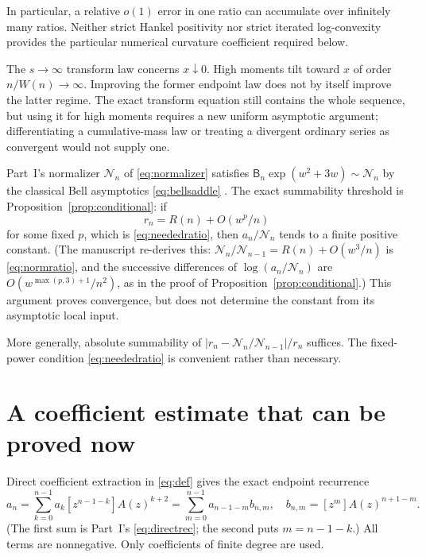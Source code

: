 \documentclass[11pt]{article}
\numberwithin{equation}{section}
\theoremstyle{definition}
\theoremstyle{remark}
\begin{document}
In particular, a relative $o(1)$ error in one ratio can accumulate over
infinitely many ratios. Neither strict Hankel positivity nor strict
iterated log-convexity provides the particular numerical curvature
coefficient required below.

The $s\to\infty$ transform law concerns $x\downarrow0$. High moments tilt
toward $x$ of order $n/W(n)\to\infty$. Improving the former endpoint law
does not by itself improve the latter regime. The exact transform equation
still contains the whole sequence, but using it for high moments requires
a new uniform asymptotic argument; differentiating a cumulative-mass law
or treating a divergent ordinary series as convergent would not supply
one.

Part~I's normalizer $\mathcal N_n$ of \eqref{eq:normalizer} satisfies
$\mathsf B_n\exp(w^2+3w)\sim\mathcal N_n$ by the classical Bell asymptotics
\eqref{eq:bellsaddle} \cite{moserwyman}. The exact summability threshold
is Proposition~\ref{prop:conditional}: if
\[
 r_n=R(n)+O(w^p/n)
\]
for some fixed $p$, which is \eqref{eq:neededratio}, then
$a_n/\mathcal N_n$ tends to a finite positive constant. (The manuscript
re-derives this: $\mathcal N_n/\mathcal N_{n-1}=R(n)+O(w^3/n)$ is
\eqref{eq:normratio}, and the successive differences of
$\log(a_n/\mathcal N_n)$ are $O(w^{\max(p,3)+1}/n^2)$, as in the proof of
Proposition~\ref{prop:conditional}.) This argument proves convergence, but
does not determine the constant from its asymptotic local input.

More generally, absolute summability of
$|r_n-\mathcal N_n/\mathcal N_{n-1}|/r_n$ suffices. The fixed-power
condition \eqref{eq:neededratio} is convenient rather than necessary.

\section{A coefficient estimate that can be proved now}\label{ble:sec:coef}
Direct coefficient extraction in \eqref{eq:def} gives the exact endpoint
recurrence
\begin{equation}\label{ble:eq:rec}
 a_n=\sum_{k=0}^{n-1}a_k[z^{n-1-k}]A(z)^{k+2}
 =\sum_{m=0}^{n-1}a_{n-1-m}b_{n,m},
 \quad b_{n,m}=[z^m]A(z)^{n+1-m}.
\end{equation}
(The first sum is Part~I's \eqref{eq:directrec}; the second puts
$m=n-1-k$.) All terms are nonnegative. Only coefficients of finite degree
are used.
\end{document}
